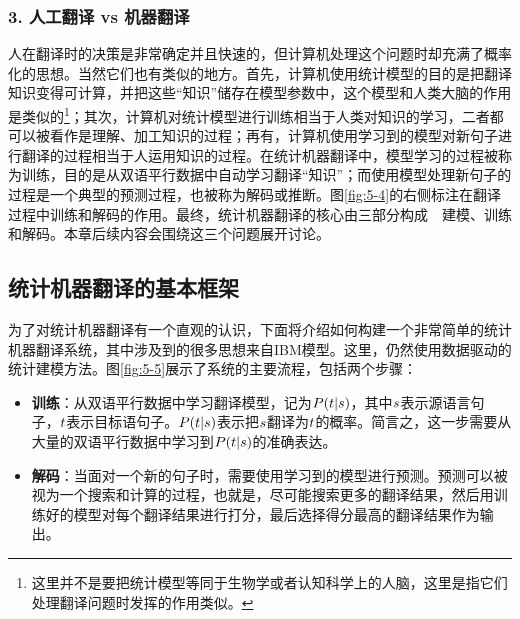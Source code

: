 \subsubsection{3. 人工翻译 vs 机器翻译}
\parinterval 人在翻译时的决策是非常确定并且快速的，但计算机处理这个问题时却充满了概率化的思想。当然它们也有类似的地方。首先，计算机使用统计模型的目的是把翻译知识变得可计算，并把这些“知识”储存在模型参数中，这个模型和人类大脑的作用是类似的\footnote{这里并不是要把统计模型等同于生物学或者认知科学上的人脑，这里是指它们处理翻译问题时发挥的作用类似。}；其次，计算机对统计模型进行训练相当于人类对知识的学习，二者都可以被看作是理解、加工知识的过程；再有，计算机使用学习到的模型对新句子进行翻译的过程相当于人运用知识的过程。在统计机器翻译中，模型学习的过程被称为训练，目的是从双语平行数据中自动学习翻译“知识”；而使用模型处理新句子的过程是一个典型的预测过程，也被称为解码或推断。图\ref{fig:5-4}的右侧标注在翻译过程中训练和解码的作用。最终，统计机器翻译的核心由三部分构成\ \dash \ 建模、训练和解码。本章后续内容会围绕这三个问题展开讨论。


\subsection{统计机器翻译的基本框架}

\parinterval 为了对统计机器翻译有一个直观的认识，下面将介绍如何构建一个非常简单的统计机器翻译系统，其中涉及到的很多思想来自IBM模型。这里，仍然使用数据驱动的统计建模方法。图\ref{fig:5-5}展示了系统的主要流程，包括两个步骤：

\begin{itemize}
\vspace{0.5em}
\item {\small\sffamily\bfseries{训练}}：从双语平行数据中学习翻译模型，记为${P}({t}|{s})$，其中${s}$表示源语言句子，${t}$表示目标语句子。${P}({t}|{s})$表示把${s}$翻译为${t}$的概率。简言之，这一步需要从大量的双语平行数据中学习到${P}({t}|{s})$的准确表达。
\vspace{0.5em}
\item {\small\sffamily\bfseries{解码}}：当面对一个新的句子时，需要使用学习到的模型进行预测。预测可以被视为一个搜索和计算的过程，也就是，尽可能搜索更多的翻译结果，然后用训练好的模型对每个翻译结果进行打分，最后选择得分最高的翻译结果作为输出。
\vspace{0.5em}
\end{itemize}

